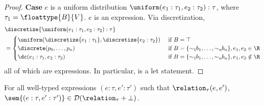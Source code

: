 \begin{proof}
	\textbf{Case} $e$ is a uniform distribution $\uniform(e_1 : \tau_1, e_2 : \tau_2) : \tau$, where $\tau_1 = \floattype{B}{V}$. $e$ is an expression. Via discretization,
	\begin{align*}
		&\discretize{\uniform(e_1 : \tau_1, e_2 : \tau_2) : \tau} \\
		&= \begin{cases}
			\uniform(\discretize{e_1 : \tau_1}, \discretize{e_2 : \tau_2}) &\text{ if } B = \top \\
			\discrete(p_0,\ldots,p_n) &\text{ if } B = \{\sim_1\!\!b_1, \ldots, \sim_n\!\!b_n\}, e_1,e_2 \in \R \\
			\dc(e_1 : \tau_1,e_2 : \tau_2) &\text{ if } B = \{\sim_1\!\!b_1, \ldots, \sim_n\!\!b_n\}, e_1,e_2 \notin \R
		\end{cases}
	\end{align*}
	all of which are expressions. In particular, \dc is a let statement.
\end{proof}


\begin{lemma}
	For all well-typed expressions $(e : \tau, e' : \tau')$ such that $\relation_{\tau}(e,e')$, $\sem{(e : \tau,e' : \tau')} \in \mathcal{D}(\relation_{\tau} + \bot)$.
\end{lemma}

